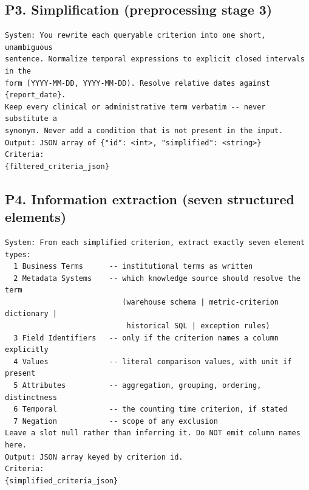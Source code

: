 \documentclass[10pt]{article}
\begin{document}
\subsection{P3. Simplification (preprocessing stage 3)}
\begin{Verbatim}[fontsize=\footnotesize,frame=single,framesep=4pt]
System: You rewrite each queryable criterion into one short, unambiguous
sentence. Normalize temporal expressions to explicit closed intervals in the
form [YYYY-MM-DD, YYYY-MM-DD). Resolve relative dates against {report_date}.
Keep every clinical or administrative term verbatim -- never substitute a
synonym. Never add a condition that is not present in the input.
Output: JSON array of {"id": <int>, "simplified": <string>}
Criteria:
{filtered_criteria_json}
\end{Verbatim}

\subsection{P4. Information extraction (seven structured elements)}
\begin{Verbatim}[fontsize=\footnotesize,frame=single,framesep=4pt]
System: From each simplified criterion, extract exactly seven element types:
  1 Business Terms      -- institutional terms as written
  2 Metadata Systems    -- which knowledge source should resolve the term
                           (warehouse schema | metric-criterion dictionary |
                            historical SQL | exception rules)
  3 Field Identifiers   -- only if the criterion names a column explicitly
  4 Values              -- literal comparison values, with unit if present
  5 Attributes          -- aggregation, grouping, ordering, distinctness
  6 Temporal            -- the counting time criterion, if stated
  7 Negation            -- scope of any exclusion
Leave a slot null rather than inferring it. Do NOT emit column names here.
Output: JSON array keyed by criterion id.
Criteria:
{simplified_criteria_json}
\end{Verbatim}
\end{document}
